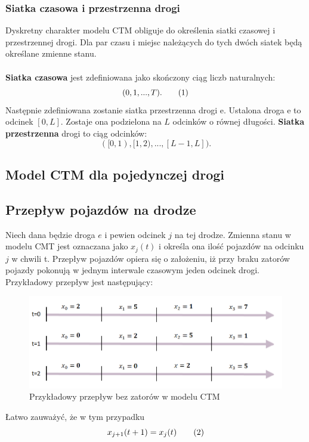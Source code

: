 \documentclass[12pt]{book}
\theoremstyle{plain}
\newcommand\addtag{\refstepcounter{equation}
\renewcommand{\labelenumii}{\theenumii}
\renewcommand{\theenumii}{\theenumi.\arabic{enumii}.}
\tag{\theequation}}
\begin{document}
\subsubsection*{Siatka czasowa i przestrzenna drogi}
Dyskretny charakter modelu CTM obliguje do określenia siatki czasowej i przestrzennej drogi. Dla par czasu i miejsc należących do tych dwóch siatek będą określane zmienne stanu. \\ \\ \textbf{Siatka czasowa} jest zdefiniowana jako skończony ciąg liczb naturalnych:
\[(0,1,...,T). \addtag \]
Następnie zdefiniowana zostanie siatka przestrzenna drogi e. Ustalona droga e to odcinek $[0,L]$. Zostaje ona podzielona na $L$ odcinków o równej długości. \textbf{Siatka przestrzenna} drogi to ciąg odcinków:
\[([0,1),[1,2),...,[L-1,L] ).\]

\subsection{Model CTM dla pojedynczej drogi}
\subsection*{Przepływ pojazdów na drodze}
Niech dana będzie droga $e$ i pewien odcinek $j$ na tej drodze. Zmienna stanu w modelu CMT jest oznaczana jako $x_j(t)$ i określa ona ilość pojazdów na odcinku $j$ w chwili t.
Przepływ pojazdów opiera się o założeniu, iż przy braku zatorów pojazdy pokonują w jednym interwale czasowym jeden odcinek drogi. Przykładowy przepływ jest następujący:
\begin{figure}[H]
	\centering
	\includegraphics[width=14cm]{images/CTM_flow_example}
	\caption{Przykładowy przepływ bez zatorów w modelu CTM}
	\label{fig:CTM_flow_example}
\end{figure} \noindent
Łatwo zauważyć, że w tym przypadku
\[ x_{j+1}(t+1)=x_j(t) \addtag \]
\end{document}
